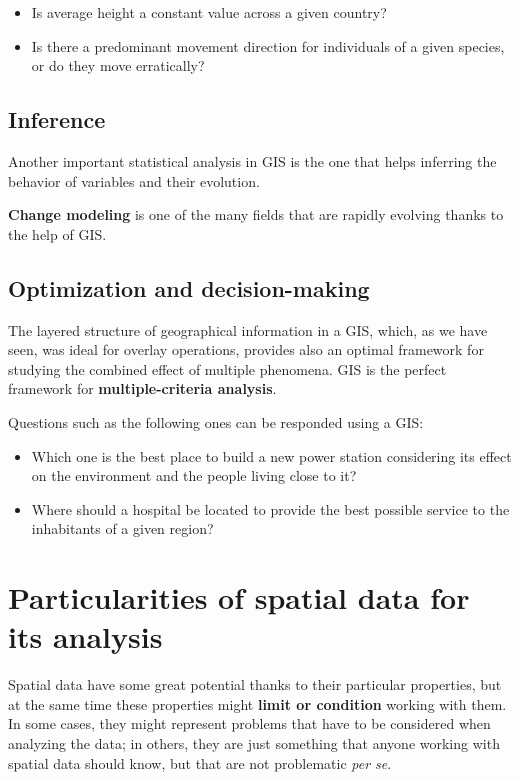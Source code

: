 \begin{itemize}
\item Is average height a constant value across a given country?
\item Is there a predominant movement direction for individuals of a given species, or do they move erratically?
\end{itemize}

\subsection{Inference}

Another important statistical analysis in GIS is the one that helps inferring the behavior of variables and their evolution.

\textbf{Change modeling} is one of the many fields that are rapidly evolving thanks to the help of GIS.

\subsection{Optimization and decision-making}

The layered structure of geographical information in a GIS, which, as we have seen, was ideal for overlay operations, provides also an optimal framework for studying the combined effect of multiple phenomena. GIS is the perfect framework for \textbf{multiple-criteria analysis}.

Questions such as the following ones can be responded using a GIS:

\begin{itemize}
\item Which one is the best place to build a new power station considering its effect on the environment and the people living close to it?
\item Where should a hospital be located to provide the best possible service to the inhabitants of a given region?
\end{itemize}


\section{Particularities of spatial data for its analysis}

Spatial data have some great potential thanks to their particular properties, but at the same time these properties might \textbf{limit or condition} working with them. In some cases, they might represent problems that have to be considered when analyzing the data; in others, they are just something that anyone working with spatial data should know, but that are not problematic \emph{per se}.

